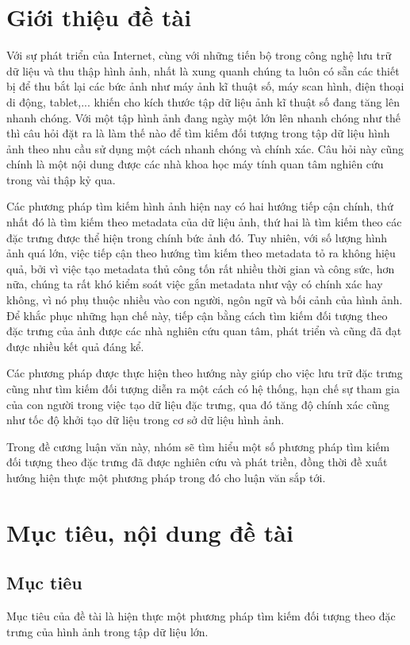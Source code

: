 \documentclass[a4paper,14pt]{extreport}
\begin{document}
\section{Giới thiệu đề tài}
Với sự phát triển của Internet, cùng với những tiến bộ trong công nghệ lưu trữ dữ liệu và thu thập hình ảnh, 
nhất là xung quanh chúng ta luôn có sẵn các thiết bị để thu bắt lại các bức ảnh như máy ảnh kĩ thuật số, máy scan hình, 
điện thoại di động, tablet,... khiến cho kích thước tập dữ liệu ảnh kĩ thuật số đang tăng lên nhanh chóng. 
Với một tập hình ảnh đang ngày một lớn lên nhanh chóng như thế thì câu hỏi đặt ra là làm thế nào để tìm kiếm đối 
tượng trong tập dữ liệu hình ảnh theo nhu cầu sử dụng một cách nhanh chóng và chính xác. Câu hỏi này cũng chính là 
một nội dung được các nhà khoa học máy tính quan tâm nghiên cứu trong vài thập kỷ qua.
\par 
Các phương pháp tìm kiếm hình ảnh hiện nay có hai hướng tiếp cận chính, thứ nhất đó là tìm kiếm theo metadata của dữ liệu ảnh, thứ hai là tìm kiếm 
theo các đặc trưng được thể hiện trong chính bức ảnh đó. Tuy nhiên, với số lượng hình ảnh quá lớn, việc tiếp cận 
theo hướng tìm kiếm theo metadata tỏ ra không hiệu quả, bởi vì việc tạo metadata thủ công tốn rất nhiều thời gian 
và công sức, hơn nữa, chúng ta rất khó kiểm soát việc gắn metadata như vậy có chính xác hay không, vì nó phụ thuộc 
nhiều vào con người, ngôn ngữ và bối cảnh của hình ảnh. Để khắc phục những hạn chế này, tiếp cận bằng cách tìm kiếm 
đối tượng theo đặc trưng của ảnh được các nhà nghiên cứu quan tâm, phát triển và cũng đã đạt được nhiều kết quả đáng kể. 
\par
Các phương pháp được thực hiện theo hướng này giúp cho việc lưu trữ đặc trưng cũng như tìm kiếm đối tượng diễn ra một cách 
có hệ thống, hạn chế sự tham gia của con người trong việc tạo dữ liệu đặc trưng, qua đó tăng độ chính xác cũng như tốc 
độ khởi tạo dữ liệu trong cơ sở dữ liệu hình ảnh.
\par
Trong đề cương luận văn này, nhóm sẽ tìm hiểu một số phương pháp tìm 
kiếm đối tượng theo đặc trưng đã được nghiên cứu và phát triền, đồng thời đề xuất hướng hiện thực một phương pháp trong 
đó cho luận văn sắp tới.


\section{Mục tiêu, nội dung đề tài}

\subsection{Mục tiêu}
Mục tiêu của đề tài là hiện thực một phương pháp tìm kiếm đối tượng theo đặc trưng của hình ảnh trong tập dữ liệu lớn.
\end{document}
